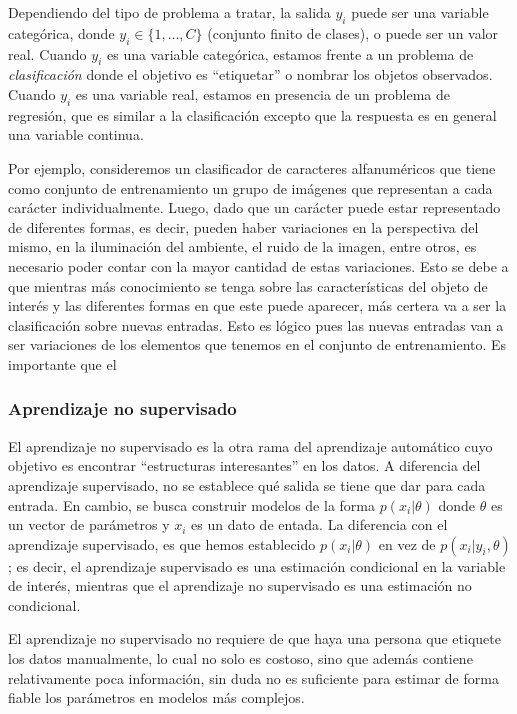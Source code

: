 	Dependiendo del tipo de problema a tratar, la salida $y_i$ puede ser una variable categórica, donde $y_i \in \{1,\dots,C\}$ (conjunto finito de clases), o puede ser un valor real. Cuando $y_i$ es una variable categórica, estamos frente a un problema de \textit{clasificación} donde el objetivo es ``etiquetar'' o nombrar los objetos observados. Cuando $y_i$ es una variable real, estamos en presencia de un problema de regresión, que es similar a la clasificación excepto que la respuesta es en general una variable continua.
	
	Por ejemplo, consideremos un clasificador de caracteres alfanuméricos que tiene como conjunto de entrenamiento un grupo de imágenes que representan a cada carácter individualmente. Luego, dado que un carácter puede estar representado de diferentes formas, es decir, pueden haber variaciones en la perspectiva del mismo, en la iluminación del ambiente, el ruido de la imagen, entre otros, es necesario poder contar con la mayor cantidad de estas variaciones. Esto se debe a que mientras más conocimiento se tenga sobre las características del objeto de interés y las diferentes formas en que este puede aparecer, más certera va a ser la clasificación sobre nuevas entradas. Esto es lógico pues las nuevas entradas van a ser variaciones de los elementos que tenemos en el conjunto de entrenamiento. Es importante que el
	

	\subsubsection{Aprendizaje no supervisado}
	
		El aprendizaje no supervisado es la otra rama del aprendizaje automático cuyo objetivo es encontrar ``estructuras interesantes'' en los datos. A diferencia del aprendizaje supervisado, no se establece qué salida se tiene que dar para cada entrada. En cambio, se busca construir modelos de la forma $p(x_i | \theta)$ donde $\theta$ es un vector de parámetros y $x_i$ es un dato de entada. La diferencia con el aprendizaje supervisado, es que hemos establecido $p(x_i | \theta)$ en vez de $p(x_i | y_i, \theta)$; es decir, el aprendizaje supervisado es una estimación condicional en la variable de interés, mientras que el aprendizaje no supervisado es una estimación no condicional.
		
		El aprendizaje no supervisado no requiere de que haya una persona que etiquete los datos manualmente, lo cual no solo es costoso, sino que además contiene relativamente poca información, sin duda no es suficiente para estimar de forma fiable los parámetros en modelos más complejos.